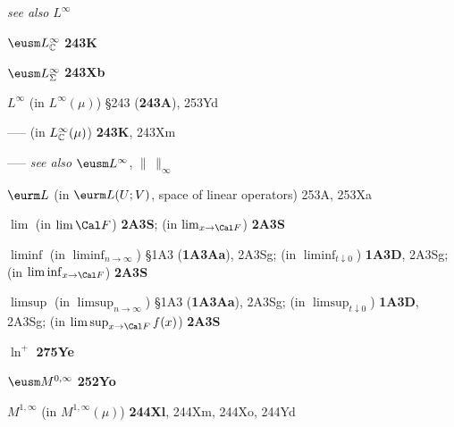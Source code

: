   {\it see also} $L^{\infty}$


$\eusm L^{\infty}_{\Bbb C}$ {\bf 243K}


$\eusm L^{\infty}_{\Sigma}$ {\bf 243Xb}


$L^{\infty}$ (in $L^{\infty}(\mu)$) \S243 ({\bf 243A}),
253Yd


----- (in $L^{\infty}_{\Bbb C}(\mu)$) {\bf 243K}, 243Xm






-----  {\it see also} $\eusm L^{\infty}$,
$\|\,\|_{\infty}$




$\eurm L$ (in $\eurm L(U;V)$, space of linear operators) 253A,
253Xa








$\lim$ (in $\lim\Cal F$) {\bf 2A3S};
  (in $\lim_{x\to\Cal F}$) {\bf 2A3S}


$\liminf$ (in $\liminf_{n\to\infty}$) \S1A3 ({\bf 1A3Aa}), 2A3Sg;
  (in $\liminf_{t\downarrow 0}$) {\bf 1A3D}, 2A3Sg;
  (in $\liminf_{x\to\Cal F}$) {\bf 2A3S}
  

$\limsup$ (in $\limsup_{n\to\infty}$) \S1A3 ({\bf 1A3Aa}), 2A3Sg;
  (in $\limsup_{t\downarrow 0}$) {\bf 1A3D}, 2A3Sg;
  (in $\limsup_{x\to\Cal F}f(x)$) {\bf 2A3S}







$\ln^+$ {\bf 275Ye}


\indexmedskip
{}









$\eusm M^{0,\infty}$ {\bf 252Yo}






$M^{1,\infty}$ (in $M^{1,\infty}(\mu)$) {\bf 244Xl}, 244Xm, 244Xo,
244Yd


















































